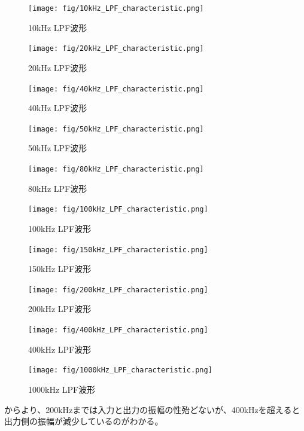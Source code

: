 \documentclass[11pt,dvipdfmx]{jarticle}
\begin{document}
\begin{figure}[H]
  \centering
  \texttt{[image: fig/10kHz\_LPF\_characteristic.png]}
  \caption{10kHz LPF波形}
  \label{fig:10kHz_LPF}
\end{figure}
\begin{figure}[H]
  \centering
  \texttt{[image: fig/20kHz\_LPF\_characteristic.png]}
  \caption{20kHz LPF波形}
  \label{fig:20kHz_LPF}
\end{figure}
\begin{figure}[H]
  \centering
  \texttt{[image: fig/40kHz\_LPF\_characteristic.png]}
  \caption{40kHz LPF波形}
  \label{fig:40kHz_LPF}
\end{figure}
\begin{figure}[H]
  \centering
  \texttt{[image: fig/50kHz\_LPF\_characteristic.png]}
  \caption{50kHz LPF波形}
  \label{fig:50kHz_LPF}
\end{figure}
\begin{figure}[H]
  \centering
  \texttt{[image: fig/80kHz\_LPF\_characteristic.png]}
  \caption{80kHz LPF波形}
  \label{fig:80kHz_LPF}
\end{figure}
\begin{figure}[H]
  \centering
  \texttt{[image: fig/100kHz\_LPF\_characteristic.png]}
  \caption{100kHz LPF波形}
  \label{fig:100kHz_LPF}
\end{figure}
\begin{figure}[H]
  \centering
  \texttt{[image: fig/150kHz\_LPF\_characteristic.png]}
  \caption{150kHz LPF波形}
  \label{fig:150kHz_LPF}
\end{figure}
\begin{figure}[H]
  \centering
  \texttt{[image: fig/200kHz\_LPF\_characteristic.png]}
  \caption{200kHz LPF波形}
  \label{fig:200kHz_LPF}
\end{figure}
\begin{figure}[H]
  \centering
  \texttt{[image: fig/400kHz\_LPF\_characteristic.png]}
  \caption{400kHz LPF波形}
  \label{fig:400kHz_LPF}
\end{figure}
\begin{figure}[H]
  \centering
  \texttt{[image: fig/1000kHz\_LPF\_characteristic.png]}
  \caption{1000kHz LPF波形}
  \label{fig:1000kHz_LPF}
\end{figure}
からより、200kHzまでは入力と出力の振幅の性殆どないが、400kHzを超えると出力側の振幅が減少しているのがわかる。
\end{document}
